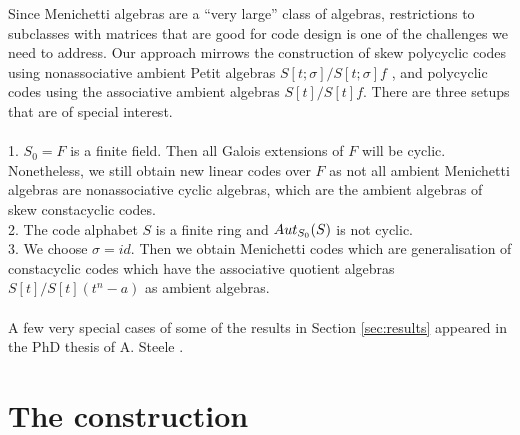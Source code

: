\documentclass[11pt]{amsart}
\theoremstyle{plain}
\theoremstyle{definition}
\begin{document}
 Since Menichetti algebras are a ``very large'' class of algebras, restrictions to subclasses with  matrices that are good for code design is one of the challenges we need to address.
 Our approach mirrows the construction of skew polycyclic codes using nonassociative  ambient Petit algebras $S[t;\sigma]/S[t;\sigma]f$ \cite{Pum2017, Pum2025}, and polycyclic codes using the associative ambient algebras $S[t]/S[t]f$.  There are three setups that are of special interest.
\\\\
 1.
 $S_0=F$ is a finite field. Then all Galois extensions of $F$ will be cyclic. Nonetheless, we still obtain new linear  codes over $F$ as not all ambient Menichetti algebras are nonassociative cyclic algebras, which are the ambient algebras of skew constacyclic codes.
\\ 2. The code alphabet $S$ is a finite ring and ${\rm Aut}_{S_0}(S)$ is not cyclic.
\\ 3. We choose $\sigma=id$. Then we obtain Menichetti codes which are  generalisation of constacyclic codes which have  the associative quotient algebras $S[t]/S[t](t^n-a)$ as ambient algebras.
\\\\
A few very special cases of some of the results in Section  \ref{sec:results} appeared in the PhD thesis of A. Steele \cite{St}.


\section{The construction} \label{sec:classical}
\end{document}

